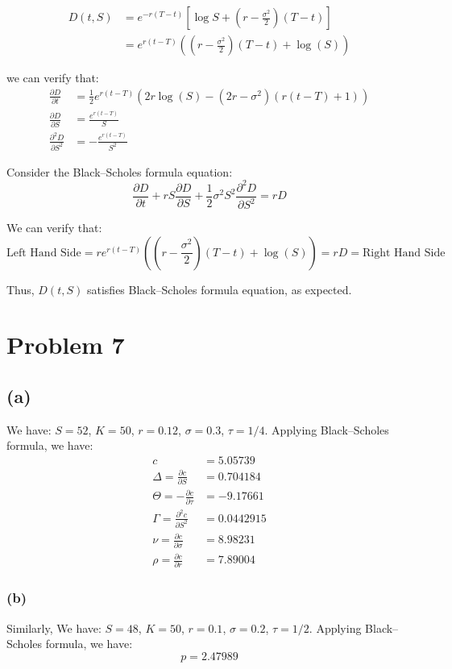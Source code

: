 \documentclass{article}
\begin{document}
\begin{align}
D(t, S) & = e^{-r(T-t)} \left[ \log S + \left( r - \frac{\sigma^2}{2} \right) (T-t) \right] \\
& = e^{r (t-T)} \left(\left(r-\frac{\sigma ^2}{2}\right) (T-t)+\log (S)\right)
\end{align}


we can verify that: 
\begin{align}
\frac{\partial D}{\partial t} & = \frac{1}{2} e^{r (t-T)} \left(2 r \log (S)-\left(2 r-\sigma ^2\right) (r (t-T)+1)\right)\\
\frac{\partial D}{\partial S} & = \frac{e^{r (t-T)}}{S} \\
\frac{\partial^2 D}{\partial S^2} & = -\frac{e^{r (t-T)}}{S^2}
\end{align}


Consider the Black–Scholes formula equation:
\begin{equation}
\frac{\partial D}{\partial t} + r S \frac{\partial D}{\partial S} + \frac{1}{2} \sigma^2 S^2 \frac{\partial^2 D}{\partial S^2} = rD  
\end{equation}


We can verify that:
\begin{equation}
  \text{Left Hand Side} = r e^{r (t-T)} \left(\left(r-\frac{\sigma ^2}{2}\right) (T-t)+\log (S)\right) = r D = \text{Right Hand Side}
\end{equation}

Thus, \(D(t,S)\) satisfies Black–Scholes formula equation, as expected.

\section{Problem 7}\label{problem-7}

\subsection{(a)}\label{a-2}

We have: \(S = 52\), \(K = 50\), \(r = 0.12\), \(\sigma = 0.3\),
\(\tau = 1/4\). Applying Black–Scholes formula, we have: \[ 
\begin{aligned}
c & = 5.05739 \\
\Delta = \frac{\partial c}{\partial S} & = 0.704184 \\
\Theta = - \frac{\partial c}{\partial \tau} & = -9.17661 \\
\Gamma = \frac{\partial^2 c}{\partial S^2} & = 0.0442915 \\
\nu = \frac{\partial c}{\partial \sigma} & = 8.98231 \\
\rho = \frac{\partial c}{\partial r} & = 7.89004
\end{aligned}
\]

\subsubsection{(b)}\label{b-2}

Similarly, We have: \(S = 48\), \(K = 50\), \(r = 0.1\), \(\sigma = 0.2\),
\(\tau = 1/2\). Applying Black–Scholes formula, we have: 
\begin{equation}
p = 2.47989  
\end{equation}
\end{document}
